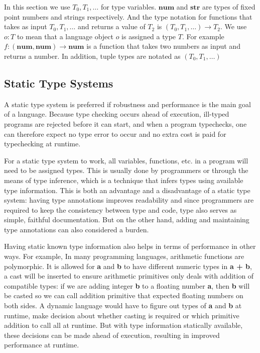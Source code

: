 \newcommand{\tnum}{\textbf{num}}
\newcommand{\tstr}{\textbf{str}}
\newcommand{\tarr}[2]{#1 \rightarrow #2}

In this section we use $T_0, T_1, \ldots$ for type variables.
$\tnum$ and $\tstr$ are types of fixed point numbers and strings respectively.
And the type notation for functions that takes as input $T_0, T_1, \ldots$
and returns a value of $T_2$ is $\tarr{(T_0, T_1, \ldots)}{T_2}$.
We use $o : T$ to mean that a language object $o$ is assigned a type $T$.
For example $f : \tarr{(\tnum, \tnum)}{\tnum}$ is a function that
takes two numbers as input and returns a number.
In addition, tuple types are notated as $(T_0, T_1, \ldots)$

\subsection{Static Type Systems}


A static type system is preferred if robustness and performance
is the main goal of a language.
Because type checking occurs ahead of execution,
ill-typed programs are rejected before it can start, and
when a program typechecks,
one can therefore expect no type error to occur and
no extra cost is paid for typechecking at runtime.


For a static type system to work, all variables, functions, etc. in a program
will need to be assigned types. This is usually done by programmers or through the
means of type inference, which is a technique that infers types using
available type information. This is both an advantage and a disadvantage
of a static type system: having type annotations improves readability
and since programmers are required to keep the consistency between type and code,
type also serves as simple, faithful documentation. But on the other hand,
adding and maintaining type annotations can also considered a burden.

Having static known type information also helps in terms of performance in other ways.
For example, In many programming languages, arithmetic functions are polymorphic.
It is allowed for \textbf{a} and \textbf{b} to have different numeric types in \textbf{a + b}, a cast will be inserted to ensure arithmetic primitives only deals with addition of compatible types: if we are adding integer \textbf{b} to a floating number \textbf{a}, then \textbf{b} will be casted so we can call addition primitive that expected floating numbers on both sides.
A dynamic language would have to figure out types of \textbf{a} and \textbf{b} at runtime, make decision about whether casting is required or which primitive addition to call all at runtime. But with type information statically available,
these decisions can be made ahead of execution,
resulting in improved performance at runtime.

